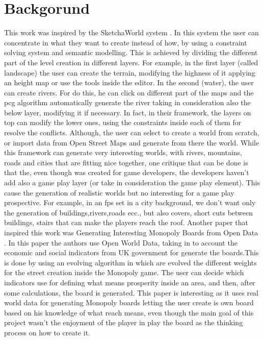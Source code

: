 \documentclass[conference]{IEEEtran}
\begin{document}
\section{Backgorund}

This work was inspired by the SketchaWorld system \cite{sketchaworld}. In this system the user can concentrate in what they want to create instead of how, by using a constraint solving system and semantic modelling. This is achieved by dividing the different part of the level creation in different layers. For example, in the first layer (called landscape) the user can create the terrain, modifying the highness of it applying an height map or use the tools inside the editor. In the second (water), the user can create rivers. For do this, he can click on different part of the maps and the pcg algorithm automatically generate the river taking in consideration also the below layer, modifying it if necessary. In fact, in their framework, the layers on top can modify the lower ones, using the constraints inside each of them for resolve the conflicts. Although, the user can select to create a world from scratch, or import data from Open Street Maps and generate from there the world. \newline
While this framework can generate very interesting worlds, with rivers, mountains, roads and cities that are fitting nice together, one critique that can be done is that the, even though was created for game developers, the developers haven't add also a game play layer (or take in consideration the game play element). This cause the generation of realistic worlds but no interesting for a game play prospective. For example, in an fps set in a city background, we don't want only the generation of buildings,rivers,roads ecc., but also covers, short cuts between buildings, stairs that can make the players reach the roof.
\newline
\newline
Another paper that inspired this work was Generating Interesting Monopoly Boards from Open Data \cite{monopoly}. In this paper the authors use Open World Data, taking in to account the economic and social indicators from UK government for generate the boards.This is done by using an evolving algorithm in which are evolved the different weights for the street creation inside the Monopoly game. The user can decide which indicators use for defining what means prosperity inside an area, and then, after some calculations, the board is generated. This paper is interesting as it uses real world data for generating Monopoly boards letting the user create is own board based on his knowledge of what reach means, even though the main goal of this project wasn't the enjoyment of the player in play the board as the thinking process on how to create it.
\end{document}
